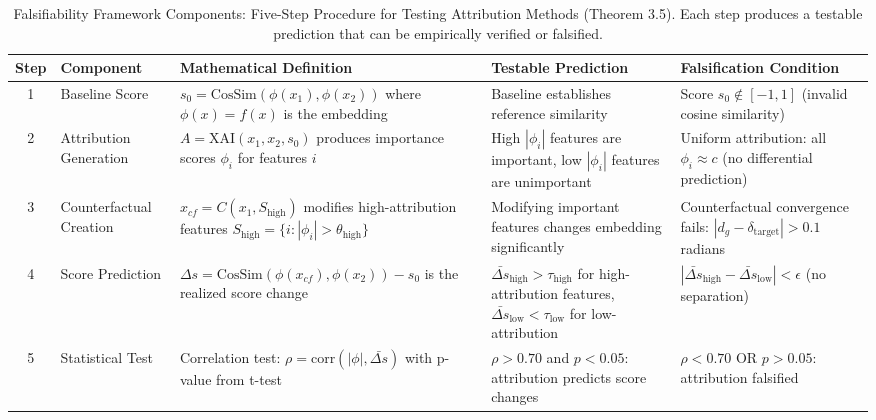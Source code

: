 
\begin{table}[htbp]
\centering
\small
\caption{Falsifiability Framework Components: Five-Step Procedure for Testing Attribution Methods (Theorem 3.5). Each step produces a testable prediction that can be empirically verified or falsified.}
\label{tab:falsifiability_framework}
\begin{tabular}{clp{5.5cm}p{4.5cm}p{3.5cm}}
\toprule
\textbf{Step} & \textbf{Component} & \textbf{Mathematical Definition} & \textbf{Testable Prediction} & \textbf{Falsification Condition} \\
\midrule
1
& Baseline Score
& $s_0 = \text{CosSim}(\phi(x_1), \phi(x_2))$ where $\phi(x) = f(x)$ is the embedding
& Baseline establishes reference similarity
& Score $s_0 \not\in [-1, 1]$ (invalid cosine similarity) \\
\midrule
2
& Attribution Generation
& $A = \text{XAI}(x_1, x_2, s_0)$ produces importance scores $\phi_i$ for features $i$
& High $|\phi_i|$ features are important, low $|\phi_i|$ features are unimportant
& Uniform attribution: all $\phi_i \approx c$ (no differential prediction) \\
\midrule
3
& Counterfactual Creation
& $x_{cf} = C(x_1, S_{\text{high}})$ modifies high-attribution features $S_{\text{high}} = \{i : |\phi_i| > \theta_{\text{high}}\}$
& Modifying important features changes embedding significantly
& Counterfactual convergence fails: $|d_g - \delta_{\text{target}}| > 0.1$ radians \\
\midrule
4
& Score Prediction
& $\Delta s = \text{CosSim}(\phi(x_{cf}), \phi(x_2)) - s_0$ is the realized score change
& $\bar{\Delta s}_{\text{high}} > \tau_{\text{high}}$ for high-attribution features, $\bar{\Delta s}_{\text{low}} < \tau_{\text{low}}$ for low-attribution
& $|\bar{\Delta s}_{\text{high}} - \bar{\Delta s}_{\text{low}}| < \epsilon$ (no separation) \\
\midrule
5
& Statistical Test
& Correlation test: $\rho = \text{corr}(|\phi|, \bar{\Delta s})$ with p-value from t-test
& $\rho > 0.70$ and $p < 0.05$: attribution predicts score changes
& $\rho < 0.70$ OR $p > 0.05$: attribution falsified \\
\bottomrule
\end{tabular}
\end{table}


